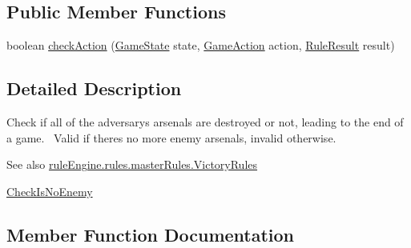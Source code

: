 \subsection*{Public Member Functions}
\begin{DoxyCompactItemize}
\item 
boolean \mbox{\hyperlink{classrule_engine_1_1rules_1_1atomic_rules_1_1_check_is_no_arsenal_enemy_af7f0d5a6d8ca7be75585b03342fcd3a9}{check\+Action}} (\mbox{\hyperlink{classgame_1_1game_state_1_1_game_state}{Game\+State}} state, \mbox{\hyperlink{classrule_engine_1_1_game_action}{Game\+Action}} action, \mbox{\hyperlink{classrule_engine_1_1_rule_result}{Rule\+Result}} result)
\end{DoxyCompactItemize}


\subsection{Detailed Description}
Check if all of the adversary\textquotesingle{}s arsenals are destroyed or not, leading to the end of a game.~\newline
 Valid if there\textquotesingle{}s no more enemy arsenals, invalid otherwise.~\newline
~\newline
 \begin{DoxySeeAlso}{See also}
\mbox{\hyperlink{classrule_engine_1_1rules_1_1master_rules_1_1_victory_rules}{rule\+Engine.\+rules.\+master\+Rules.\+Victory\+Rules}} 

\mbox{\hyperlink{classrule_engine_1_1rules_1_1atomic_rules_1_1_check_is_no_enemy}{Check\+Is\+No\+Enemy}} 
\end{DoxySeeAlso}


\subsection{Member Function Documentation}
\mbox{\label{classrule_engine_1_1rules_1_1atomic_rules_1_1_check_is_no_arsenal_enemy_af7f0d5a6d8ca7be75585b03342fcd3a9}} 
